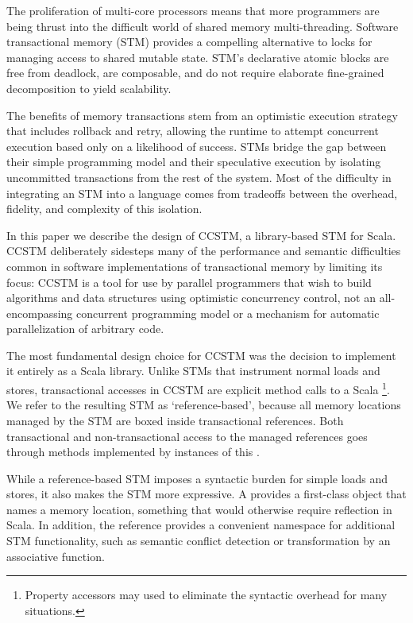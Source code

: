 The proliferation of multi-core processors means that more programmers are
being thrust into the difficult world of shared memory multi-threading.
Software transactional memory (STM) provides a compelling alternative to
locks for managing access to shared mutable state.  STM's declarative
atomic blocks are free from deadlock, are composable, and do not
require elaborate fine-grained decomposition to yield scalability.

The benefits of memory transactions stem from an optimistic execution
strategy that includes rollback and retry, allowing the runtime to
attempt concurrent execution based only on a likelihood of success.
STMs bridge the gap between their simple programming model and their
speculative execution by isolating uncommitted transactions from the
rest of the system.  Most of the difficulty in integrating an STM into
a language comes from tradeoffs between the overhead, fidelity, and
complexity of this isolation.

In this paper we describe the design of CCSTM, a library-based STM for
Scala.  CCSTM deliberately sidesteps many of the performance and semantic
difficulties common in software implementations of transactional memory
by limiting its focus: CCSTM is a tool for use by parallel programmers
that wish to build algorithms and data structures using optimistic
concurrency control, not an all-encompassing concurrent programming
model or a mechanism for automatic parallelization of arbitrary code.

The most fundamental design choice for CCSTM was the decision to
implement it entirely as a Scala library.  Unlike STMs that instrument
normal loads and stores, transactional accesses in CCSTM are explicit
method calls to a Scala \footnote{Property accessors
may used to eliminate the syntactic overhead for many situations.  }.
We refer to the resulting STM as `reference-based', because all memory
locations managed by the STM are boxed inside transactional references.
Both transactional and non-transactional access to the managed references
goes through methods implemented by instances of this .

While a reference-based STM imposes a syntactic burden for simple loads and
stores, it also makes the STM more expressive.  A  provides
a first-class object that names a memory location, something that would
otherwise require reflection in Scala.  In addition, the reference provides a
convenient namespace for additional STM functionality, such as semantic
conflict detection or transformation by an associative function.

